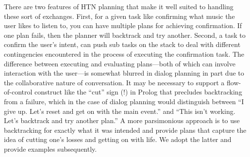 \documentclass[letterpaper,11pt]{article}
\begin{document}
There are two features of HTN planning that make it well suited to handling these sort of exchanges. First, for a given task like confirming what music the user likes to listen to, you can have multiple plans for achieving confirmation. If one plan fails, then the planner will backtrack and try another. Second, a task to confirm the user's intent, can push sub tasks on the stack to deal with different contingencies encountered in the process of executing the confirmation task. The difference between executing and evaluating plans---both of which can involve interaction with the user---is somewhat blurred in dialog planning in part due to the collaborative nature of conversation. It may be necessary to support a flow-of-control construct like the ``cut'' sign (!) in Prolog that precludes backtracking from a failure, which in the case of dialog planning would distinguish between ``I give up. Let's reset and get on with the main event.'' and ``This isn't working. Let's backtrack and try another plan.'' A more parsimonious approach is to use backtracking for exactly what it was intended and provide plans that capture the idea of cutting one's losses and getting on with life.  We adopt the latter and provide examples subsequently. 
\end{document}
